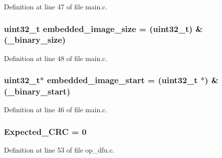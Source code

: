 Definition at line 47 of file main.\-c.

\hypertarget{group___open_pilot_b_l_ga9735096d394222154ea06b9b81667254}{
\subsubsection[{embedded\-\_\-image\-\_\-size}]{ {\bf uint32\-\_\-t} embedded\-\_\-image\-\_\-size = ({\bf uint32\-\_\-t}) \&({\bf \-\_\-binary\-\_\-size})}}\label{group___open_pilot_b_l_ga9735096d394222154ea06b9b81667254}


Definition at line 48 of file main.\-c.

\hypertarget{group___open_pilot_b_l_ga3afaa362525714c794fa80cf079ff93f}{
\subsubsection[{embedded\-\_\-image\-\_\-start}]{ {\bf uint32\-\_\-t}$\ast$ embedded\-\_\-image\-\_\-start = ({\bf uint32\-\_\-t} $\ast$) \&({\bf \-\_\-binary\-\_\-start})}}\label{group___open_pilot_b_l_ga3afaa362525714c794fa80cf079ff93f}


Definition at line 46 of file main.\-c.

\hypertarget{group___open_pilot_b_l_ga94f31f25ef279f9c71f72fc084e684dc}{
\subsubsection[{Expected\-\_\-\-C\-R\-C}]{ Expected\-\_\-\-C\-R\-C = 0}}\label{group___open_pilot_b_l_ga94f31f25ef279f9c71f72fc084e684dc}


Definition at line 53 of file op\-\_\-dfu.\-c.

